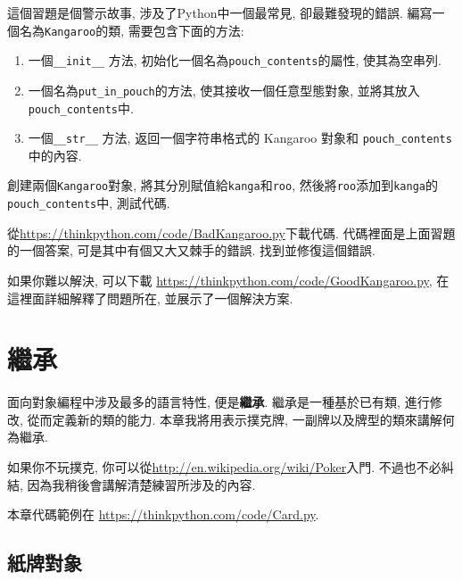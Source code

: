 \documentclass[10pt]{book}
\begin{document}
\begin{exercise}
\label{kangaroo}

這個習題是個警示故事, 涉及了Python中一個最常見, 卻最難發現的錯誤. 
編寫一個名為{\tt Kangaroo}的類, 需要包含下面的方法:

\begin{enumerate}

\item 一個\verb"__init__" 方法, 初始化一個名為\verb"pouch_contents"的屬性, 
使其為空串列. 

\item 一個名為\verb"put_in_pouch"的方法, 使其接收一個任意型態對象, 並將其放入
\verb"pouch_contents"中. 

\item 一個\verb"__str__" 方法, 返回一個字符串格式的 Kangaroo 對象和 \verb"pouch_contents" 中的內容. 

\end{enumerate}
%
創建兩個{\tt Kangaroo}對象, 將其分別賦值給{\tt kanga}和{\tt roo}, 
然後將{\tt roo}添加到{\tt kanga}的\verb"pouch_contents"中, 測試代碼. 

從\url{https://thinkpython.com/code/BadKangaroo.py}下載代碼. 
代碼裡面是上面習題的一個答案, 
可是其中有個又大又棘手的錯誤. 找到並修復這個錯誤. 

如果你難以解決, 可以下載
\url{https://thinkpython.com/code/GoodKangaroo.py}, 
在這裡面詳細解釋了問題所在, 並展示了一個解決方案. 

\end{exercise}


\chapter{繼承}

面向對象編程中涉及最多的語言特性, 便是{\bf 繼承}. 
繼承是一種基於已有類, 進行修改, 從而定義新的類的能力. 
本章我將用表示撲克牌, 一副牌以及牌型的類來講解何為繼承. 

如果你不玩撲克, 你可以從\url{http://en.wikipedia.org/wiki/Poker}入門. 
不過也不必糾結, 因為我稍後會講解清楚練習所涉及的內容. 

本章代碼範例在
\url{https://thinkpython.com/code/Card.py}.


\section{紙牌對象}
\end{document}
